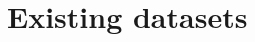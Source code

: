 \documentclass{libs/ufc_format}
\begin{document}

%     

%     

%     

%     

\section{Existing datasets}
\end{document}
